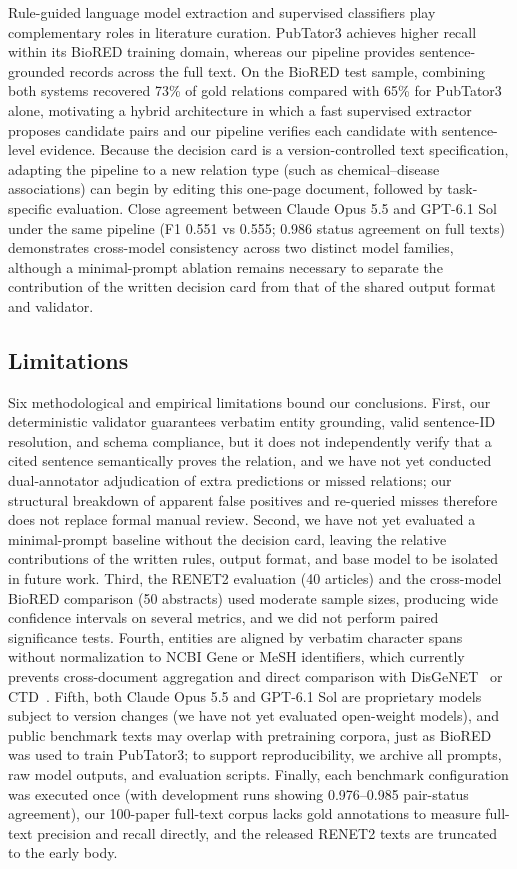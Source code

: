 \documentclass[preprint,10pt,letterpaper]{elsarticle}
\begin{document}
Rule-guided language model extraction and supervised classifiers play complementary roles in literature curation. PubTator3 achieves higher recall within its BioRED training domain, whereas our pipeline provides sentence-grounded records across the full text. On the BioRED test sample, combining both systems recovered 73\% of gold relations compared with 65\% for PubTator3 alone, motivating a hybrid architecture in which a fast supervised extractor proposes candidate pairs and our pipeline verifies each candidate with sentence-level evidence. Because the decision card is a version-controlled text specification, adapting the pipeline to a new relation type (such as chemical--disease associations) can begin by editing this one-page document, followed by task-specific evaluation. Close agreement between Claude Opus 5.5 and GPT-6.1 Sol under the same pipeline (F1 0.551 vs 0.555; 0.986 status agreement on full texts) demonstrates cross-model consistency across two distinct model families, although a minimal-prompt ablation remains necessary to separate the contribution of the written decision card from that of the shared output format and validator.

\subsection{Limitations}\label{sec:limitations}
Six methodological and empirical limitations bound our conclusions. First, our deterministic validator guarantees verbatim entity grounding, valid sentence-ID resolution, and schema compliance, but it does not independently verify that a cited sentence semantically proves the relation, and we have not yet conducted dual-annotator adjudication of extra predictions or missed relations; our structural breakdown of apparent false positives and re-queried misses therefore does not replace formal manual review. Second, we have not yet evaluated a minimal-prompt baseline without the decision card, leaving the relative contributions of the written rules, output format, and base model to be isolated in future work. Third, the RENET2 evaluation (40 articles) and the cross-model BioRED comparison (50 abstracts) used moderate sample sizes, producing wide confidence intervals on several metrics, and we did not perform paired significance tests. Fourth, entities are aligned by verbatim character spans without normalization to NCBI Gene or MeSH identifiers, which currently prevents cross-document aggregation and direct comparison with DisGeNET~\cite{pinero2020disgenet} or CTD~\cite{davis2023ctd}. Fifth, both Claude Opus 5.5 and GPT-6.1 Sol are proprietary models subject to version changes (we have not yet evaluated open-weight models), and public benchmark texts may overlap with pretraining corpora, just as BioRED was used to train PubTator3; to support reproducibility, we archive all prompts, raw model outputs, and evaluation scripts. Finally, each benchmark configuration was executed once (with development runs showing 0.976--0.985 pair-status agreement), our 100-paper full-text corpus lacks gold annotations to measure full-text precision and recall directly, and the released RENET2 texts are truncated to the early body.
\end{document}
